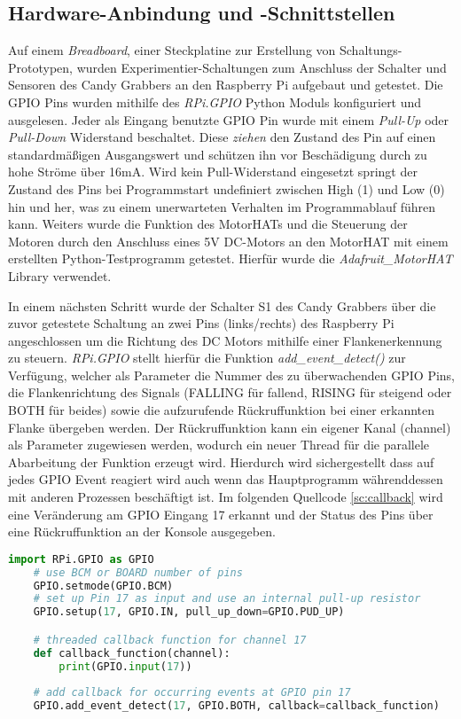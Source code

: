 \documentclass[BMR,Bachelor,ngerman]{twbook}%
\begin{document}
\subsection{Hardware-Anbindung und -Schnittstellen}
Auf einem \emph{Breadboard}, einer Steckplatine zur Erstellung von Schaltungs-Prototypen, wurden Experimentier-Schaltungen zum Anschluss der Schalter und Sensoren des Candy Grabbers an den Raspberry Pi aufgebaut und getestet. Die \ac{GPIO} Pins wurden mithilfe des \emph{RPi.GPIO} Python Moduls konfiguriert und ausgelesen. Jeder als Eingang benutzte \ac{GPIO} Pin wurde mit einem \emph{Pull-Up} oder \emph{Pull-Down} Widerstand beschaltet. Diese \emph{ziehen} den Zustand des Pin auf einen standardmäßigen Ausgangswert und schützen ihn vor Beschädigung durch zu hohe Ströme über 16mA. Wird kein Pull-Widerstand eingesetzt springt der Zustand des Pins bei Programmstart undefiniert zwischen High (1) und Low (0) hin und her, was zu einem unerwarteten Verhalten im Programmablauf führen kann. Weiters wurde die Funktion des MotorHATs und die Steuerung der Motoren durch den Anschluss eines 5V DC-Motors an den MotorHAT mit einem erstellten Python-Testprogramm getestet. Hierfür wurde die \emph{Adafruit\_MotorHAT} Library verwendet. \\
%
\par In einem nächsten Schritt wurde der Schalter S1 des Candy Grabbers über die zuvor getestete Schaltung an zwei Pins (links/rechts) des Raspberry Pi angeschlossen um die Richtung des DC Motors mithilfe einer Flankenerkennung zu steuern. \emph{RPi.GPIO} stellt hierfür die Funktion \emph{add\_event\_detect()} zur Verfügung, welcher als Parameter die Nummer des zu überwachenden \ac{GPIO} Pins, die Flankenrichtung des Signals (FALLING für fallend, RISING für steigend oder BOTH für beides) sowie die aufzurufende Rückruffunktion bei einer erkannten Flanke übergeben werden. Der Rückruffunktion kann ein eigener Kanal (channel) als Parameter zugewiesen werden, wodurch ein neuer Thread für die parallele Abarbeitung der Funktion erzeugt wird. Hierdurch wird sichergestellt dass auf jedes \ac{GPIO} Event reagiert wird auch wenn das Hauptprogramm währenddessen mit anderen Prozessen beschäftigt ist. Im folgenden Quellcode \ref{sc:callback} wird eine Veränderung am \ac{GPIO} Eingang 17 erkannt und der Status des Pins über eine Rückruffunktion an der Konsole ausgegeben.\\
%
\begin{lstlisting}[language=Python,name={Beispiel für die Implementierung einer Flankenerkennung am Pin 17 des Raspberry Pi},label={sc:callback}]
	import RPi.GPIO as GPIO	
	# use BCM or BOARD number of pins								
	GPIO.setmode(GPIO.BCM)
	# set up Pin 17 as input and use an internal pull-up resistor							
	GPIO.setup(17, GPIO.IN, pull_up_down=GPIO.PUD_UP)

	# threaded callback function for channel 17
	def callback_function(channel):	
		print(GPIO.input(17))
		
	# add callback for occurring events at GPIO pin 17
	GPIO.add_event_detect(17, GPIO.BOTH, callback=callback_function)
\end{lstlisting}
\end{document}
